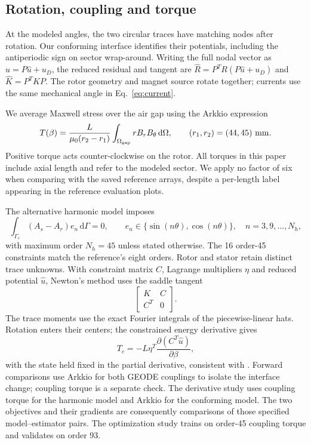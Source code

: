 \documentclass{anvil-paper}
\newcommand{\dd}{\,\mathrm{d}}
\begin{document}
\subsection{Rotation, coupling and torque}
At the modeled angles, the two circular traces have matching nodes after
rotation. Our conforming interface identifies their potentials, including
the antiperiodic sign on sector wrap-around. Writing the full nodal vector
as $u=P\hat u+u_D$, the reduced residual and tangent are
$\hat R=P^T R(P\hat u+u_D)$ and $\hat K=P^T K P$.
The rotor geometry and magnet source rotate together; currents use the
same mechanical angle in Eq.~\eqref{eq:current}.

We average Maxwell stress over the air gap using the Arkkio expression
\citep{arkkio1987}
\begin{equation}
 T(\beta)=\frac{L}{\mu_0(r_2-r_1)}
  \int_{\Omega_{\rm gap}}r B_r B_\theta\dd\Omega,
 \qquad(r_1,r_2)=(44,45)\ {\rm mm}.
 \label{eq:torque}
\end{equation}
Positive torque acts counter-clockwise on the rotor. All torques in this
paper include axial length and refer to the modeled sector. We apply no
factor of six when comparing with the saved reference arrays, despite a
per-length label appearing in the reference evaluation plots.

The alternative harmonic model imposes
\begin{equation}
 \int_{\Gamma_c}(A_s-A_r)e_n\dd\Gamma=0,\qquad
 e_n\in\{\sin(n\theta),\cos(n\theta)\},\quad n=3,9,\ldots,N_h,
\end{equation}
with maximum order $N_h=45$ unless stated otherwise. The 16 order-45
constraints match the reference's eight orders. Rotor and stator
retain distinct trace unknowns. With constraint matrix $C$, Lagrange
multipliers $\eta$ and reduced potential $\hat u$, Newton's method uses
the saddle tangent
\begin{equation}
 \begin{bmatrix}K&C\\ C^T&0\end{bmatrix}.
\end{equation}
The trace moments use the exact Fourier integrals of the piecewise-linear
hats. Rotation enters their centers; the constrained energy derivative gives
\begin{equation}
 T_c=-L\eta^T\frac{\partial(C^T\hat u)}{\partial\beta},
 \label{eq:couplingtorque}
\end{equation}
with the state held fixed in the partial derivative, consistent with
\citet{egger2022torque}. Forward comparisons use Arkkio for both GEODE
couplings to isolate the interface change; coupling torque is a separate
check. The derivative study uses coupling torque for the harmonic model
and Arkkio for the conforming model. The two objectives and their gradients
are consequently comparisons of those specified model--estimator pairs.
The optimization study trains on order-45 coupling torque and validates on
order 93.
\end{document}
